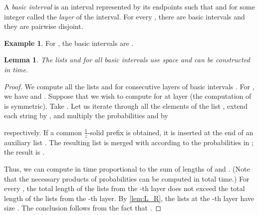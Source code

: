\documentclass{article}
\theoremstyle{plain}
\newtheorem{lemma}[theorem]{Lemma}
\theoremstyle{definition}
\newtheorem{example}[definition]{Example}
\newcommand{\fr}{\ensuremath{\frac1z}}
\newcommand{\mayqed}{}
\begin{document}
      A \emph{basic interval} is an interval  represented by its endpoints  such that
       and  for some integer  called the \emph{layer} of the interval.
      For every , there are  basic intervals and they are pairwise disjoint.
      
      \begin{example}
        For , the basic intervals are .
      \end{example}

      \begin{lemma}\label{lem:Ls_Rs}
        The lists  and  for all basic intervals  use  space
        and can be constructed in  time.
      \end{lemma}
      \begin{proof}
        We compute all the lists  and  for consecutive layers  of basic intervals .
        For , we have  and .
        Suppose that we wish to compute  for  at layer  (the computation of  is symmetric).
        Take .
        Let us iterate through all the elements  of the list , extend each string  by ,
        and multiply the probabilities  and  by
        
        respectively.
        If a common \fr-solid prefix is obtained, it is inserted at the end of an auxiliary list .
        The resulting list  is merged with  according to the probabilities in ; the result is .

        Thus, we can compute  in time proportional to the sum of lengths of  and .
        (Note that the necessary products of probabilities can be computed in  total time.)
        For every , the total length of the lists from the -th layer
        does not exceed the total length of the lists from the -th layer.
        By \cref{lem:L_R}, the lists at the -th layer have size .
        The conclusion follows from the fact that .
      \mayqed\end{proof}
\end{document}

